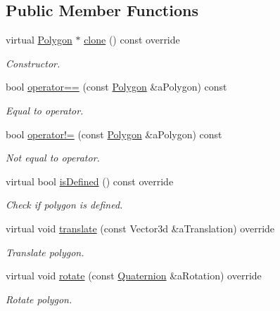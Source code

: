 \subsection*{Public Member Functions}
\begin{DoxyCompactItemize}
\item 
virtual \hyperlink{classlibrary_1_1math_1_1geom_1_1d3_1_1objects_1_1_polygon}{Polygon} $\ast$ \hyperlink{classlibrary_1_1math_1_1geom_1_1d3_1_1objects_1_1_polygon_a2dad7a1309d367e388fdf6a8141557da}{clone} () const override
\begin{DoxyCompactList}\small\item\em Constructor. \end{DoxyCompactList}\item 
bool \hyperlink{classlibrary_1_1math_1_1geom_1_1d3_1_1objects_1_1_polygon_ac8aa92cf9ed3cbcd063df07ce3a89f60}{operator==} (const \hyperlink{classlibrary_1_1math_1_1geom_1_1d3_1_1objects_1_1_polygon}{Polygon} \&a\+Polygon) const
\begin{DoxyCompactList}\small\item\em Equal to operator. \end{DoxyCompactList}\item 
bool \hyperlink{classlibrary_1_1math_1_1geom_1_1d3_1_1objects_1_1_polygon_adaa065fdf80585b0d929151efe07212e}{operator!=} (const \hyperlink{classlibrary_1_1math_1_1geom_1_1d3_1_1objects_1_1_polygon}{Polygon} \&a\+Polygon) const
\begin{DoxyCompactList}\small\item\em Not equal to operator. \end{DoxyCompactList}\item 
virtual bool \hyperlink{classlibrary_1_1math_1_1geom_1_1d3_1_1objects_1_1_polygon_a9fc4d76853843f90e2574cc1b25d6a7a}{is\+Defined} () const override
\begin{DoxyCompactList}\small\item\em Check if polygon is defined. \end{DoxyCompactList}\item 
virtual void \hyperlink{classlibrary_1_1math_1_1geom_1_1d3_1_1objects_1_1_polygon_aa0c2e161c936e39addcd783237d68090}{translate} (const Vector3d \&a\+Translation) override
\begin{DoxyCompactList}\small\item\em Translate polygon. \end{DoxyCompactList}\item 
virtual void \hyperlink{classlibrary_1_1math_1_1geom_1_1d3_1_1objects_1_1_polygon_a9c0c40a85f57ad69a59adc354181eec0}{rotate} (const \hyperlink{classlibrary_1_1math_1_1geom_1_1trf_1_1rot_1_1_quaternion}{Quaternion} \&a\+Rotation) override
\begin{DoxyCompactList}\small\item\em Rotate polygon. \end{DoxyCompactList}\end{DoxyCompactItemize}

